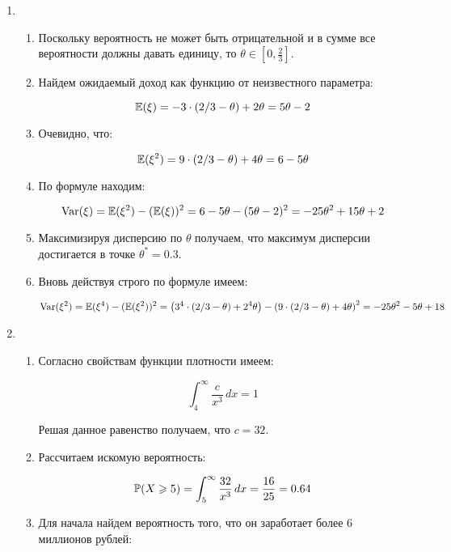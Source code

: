 \begin{enumerate}
\begin{enumerate}
	
	\end{enumerate}
	
	
	\item 
	\begin{enumerate}
		\item Поскольку вероятность не может быть отрицательной и в сумме все вероятности должны давать единицу, то $\theta\in[0,\frac{2}{3}]$.
		
		\item Найдем ожидаемый доход как функцию от неизвестного параметра:
		
		\[
		\E(\xi)=-3\cdot (2/3-\theta)+2\theta=5\theta-2
		\]
		
		\item Очевидно, что:
		
		\[
		\E(\xi^2)=9\cdot (2/3-\theta)+4\theta=6-5\theta
		\]
		
		\item По формуле находим:
		
		\[
		\Var(\xi)=\E(\xi^2)-(\E(\xi))^2=6-5\theta-(5\theta-2)^2=-25\theta^2+15\theta+2
		\]
		
		\item Максимизируя дисперсию по $\theta$ получаем, что максимум дисперсии достигается в точке $\theta^*=0.3$.
		
		\item Вновь действуя строго по формуле имеем:
		
		\[
		\Var(\xi^2)=\E(\xi^4)-(\E(\xi^2))^2=\left(3^{4}\cdot (2/3-\theta)+2^{4}\theta\right)-\left(9\cdot (2/3-\theta)+4\theta\right)^2=-25\theta^2-5\theta+18
		\]
		
	\end{enumerate}
	
	\item 
	\begin{enumerate}
		\item Согласно свойствам функции плотности имеем:
		
		\[
		\int_{4}^{\infty} \frac{c}{x^3}\, dx=1
		\]
		
		Решая данное равенство получаем, что $c=32$.
		
		\item Рассчитаем искомую вероятность:
		
		\[
		\P(X\geq5)=\int_{5}^{\infty} \frac{32}{x^3} \, dx=\frac{16}{25}=0.64
		\]
		
		\item Для начала найдем вероятность того, что он заработает более $6$ миллионов рублей:
		

\end{enumerate}
\end{enumerate}
